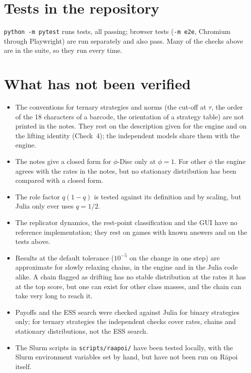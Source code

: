 \documentclass[11pt,a4paper]{article}
\begin{document}
\section{Tests in the repository}

\texttt{python -m pytest} runs \ntests{} tests, all passing; \nbrowser{} browser tests (\texttt{-m e2e}, Chromium through Playwright) are run separately and also pass. Many of the checks above are in the suite, so they run every time.

\begin{center}

\end{center}

\section{What has not been verified}

\begin{itemize}
\item The conventions for ternary strategies and norms (the cut-off at $\tau$, the order of the 18 characters of a barcode, the orientation of a strategy table) are not printed in the notes. They rest on the description given for the engine and on the lifting identity (Check~4); the independent models share them with the engine.
\item The notes give a closed form for $\phi$-Disc only at $\phi=1$. For other $\phi$ the engine agrees with the rates in the notes, but no stationary distribution has been compared with a closed form.
\item The role factor $q(1-q)$ is tested against its definition and by scaling, but Julia only ever uses $q=1/2$.
\item The replicator dynamics, the rest-point classification and the GUI have no reference implementation; they rest on games with known answers and on the tests above.
\item Results at the default tolerance ($10^{-5}$ on the change in one step) are approximate for slowly relaxing chains, in the engine and in the Julia code alike. A chain flagged as drifting has no stable distribution at the rates it has at the top score, but one can exist for other class masses, and the chain can take very long to reach it.
\item Payoffs and the ESS search were checked against Julia for binary strategies only; for ternary strategies the independent checks cover rates, chains and stationary distributions, not the ESS search.
\item The Slurm scripts in \texttt{scripts/raapoi/} have been tested locally, with the Slurm environment variables set by hand, but have not been run on R\=apoi itself.
\end{itemize}
\end{document}
